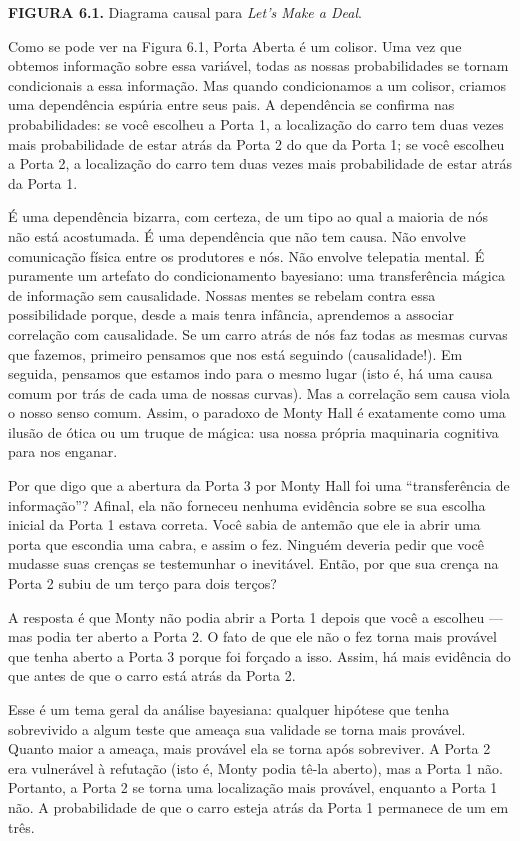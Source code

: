 \documentclass[11pt,a5paper,twoside]{book}
\begin{document}
\textbf{FIGURA 6.1.} Diagrama causal para \textit{Let’s Make a Deal}.

Como se pode ver na Figura 6.1, Porta Aberta é um colisor. Uma vez que obtemos informação sobre essa variável, todas as nossas probabilidades se tornam condicionais a essa informação. Mas quando condicionamos a um colisor, criamos uma dependência espúria entre seus pais. A dependência se confirma nas probabilidades: se você escolheu a Porta 1, a localização do carro tem duas vezes mais probabilidade de estar atrás da Porta 2 do que da Porta 1; se você escolheu a Porta 2, a localização do carro tem duas vezes mais probabilidade de estar atrás da Porta 1.

É uma dependência bizarra, com certeza, de um tipo ao qual a maioria de nós não está acostumada. É uma dependência que não tem causa. Não envolve comunicação física entre os produtores e nós. Não envolve telepatia mental. É puramente um artefato do condicionamento bayesiano: uma transferência mágica de informação sem causalidade. Nossas mentes se rebelam contra essa possibilidade porque, desde a mais tenra infância, aprendemos a associar correlação com causalidade. Se um carro atrás de nós faz todas as mesmas curvas que fazemos, primeiro pensamos que nos está seguindo (causalidade!). Em seguida, pensamos que estamos indo para o mesmo lugar (isto é, há uma causa comum por trás de cada uma de nossas curvas). Mas a correlação sem causa viola o nosso senso comum. Assim, o paradoxo de Monty Hall é exatamente como uma ilusão de ótica ou um truque de mágica: usa nossa própria maquinaria cognitiva para nos enganar.

Por que digo que a abertura da Porta 3 por Monty Hall foi uma “transferência de informação”? Afinal, ela não forneceu nenhuma evidência sobre se sua escolha inicial da Porta 1 estava correta. Você sabia de antemão que ele ia abrir uma porta que escondia uma cabra, e assim o fez. Ninguém deveria pedir que você mudasse suas crenças se testemunhar o inevitável. Então, por que sua crença na Porta 2 subiu de um terço para dois terços?

A resposta é que Monty não podia abrir a Porta 1 depois que você a escolheu — mas podia ter aberto a Porta 2. O fato de que ele não o fez torna mais provável que tenha aberto a Porta 3 porque foi forçado a isso. Assim, há mais evidência do que antes de que o carro está atrás da Porta 2.

Esse é um tema geral da análise bayesiana: qualquer hipótese que tenha sobrevivido a algum teste que ameaça sua validade se torna mais provável. Quanto maior a ameaça, mais provável ela se torna após sobreviver. A Porta 2 era vulnerável à refutação (isto é, Monty podia tê-la aberto), mas a Porta 1 não. Portanto, a Porta 2 se torna uma localização mais provável, enquanto a Porta 1 não. A probabilidade de que o carro esteja atrás da Porta 1 permanece de um em três.
\end{document}
